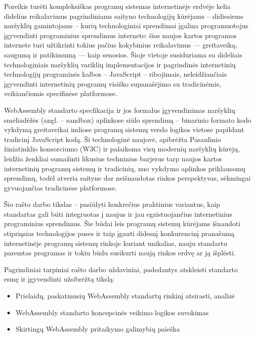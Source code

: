 \documentclass{VUMIFPSkursinis}
\begin{document}
Poreikis turėti kompleksiškas programų sistemas internetinėje erdvėje kelia didelius 
reikalavimus pagrindiniams saityno technologijų kūrėjams – didiesiems naršyklių gamintojams – 
kurių technologiniai sprendimai įgalina programuotojus įgyvendinti programinius sprendimus 
internete: šios naujos kartos programos internete turi užtikrinti tokius pačius kokybinius 
reikalavimus — greitaveiką, saugumą ir patikimumą — kaip senosios. Šioje vietoje susiduriama 
su dideliais technologiniais naršyklių variklių implementacijos ir pagrindinės internetinių 
technologijų programinės kalbos – JavaScript – ribojimais, neleidžiančiais įgyvendinti 
internetinių programų visiško supanašėjimo su tradicinėmis, veikiančiomis specifinėse 
platformose. 

WebAssembly standarto specfikacija ir jos formalus įgyvendinimas naršyklių 
smėliadėžės (angl. – sandbox) aplinkose siūlo sprendimą – binarinio formato kodo vykdymą 
greitaveikai imliose programų sistemų verslo logikos vietose papildant tradicinį JavaScript 
kodą. Ši technologinė naujovė, apibrėžta Pasaulinio žiniatinklio konsorciumo (W3C) ir palaikoma
visų modernių naršyklių kūrėjų, leidžia ženkliai sumažinti likusius techninius barjerus tarp 
naujos kartos internetinių programų sistemų ir tradicinių, nuo vykdymo aplinkos priklausomų 
sprendimų, todėl atveria saityne dar neišnaudotas rinkos perspektyvas, sėkmingai gyvuojančias
tradicinėse platformose. 

Šio rašto darbo tikslas – pasiūlyti konkrečius praktinius variantus, kaip standartas 
gali būti integruotas į naujus ir jau egzistuojančius internetinius programinius sprendimus. 
Šie būdai leis programų sistemų kūrėjams išnaudoti stipriąsias technologijos puses ir taip 
įgauti didesnį konkurencinį pranašumą internetinėje programų sistemų rinkoje kuriant unikalias, nauju standartu paremtas programas ir tokiu būdu susikurti naują rinkos erdvę ar ją išplėsti. 

Pagrindiniai tarpiniai rašto darbo uždaviniai, padedantys atskleisti standarto esmę ir įgyvendinti užsibrėžtą tikslą:
\begin{itemize}
    \item Prielaidų, paskatinusių WebAssembly standartų rinkinį atsirasti, analizė
    \item WebAssembly standarto koncepcinės veikimo logikos suvokimas
    \item Skirtingų WebAssembly pritaikymo galimybių paieška
\end{itemize}
\end{document}
